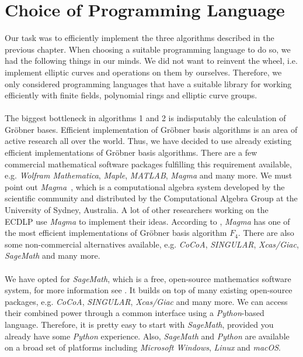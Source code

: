 \documentclass[thesis=M,english]{FITthesis}[2012/10/20]
\theoremstyle{remark}
\theoremstyle{definition}
\begin{document}
\section{Choice of Programming Language}
Our task was to efficiently implement the three algorithms described in the previous chapter. When choosing a suitable programming language to do so, we had the following things in our minds. We did not want to reinvent the wheel, i.e. implement elliptic curves and operations on them by ourselves. Therefore, we only considered programming languages that have a suitable library for working efficiently with finite fields, polynomial rings and elliptic curve groups. \\
\\ 
\noindent The biggest bottleneck in algorithms 1 and 2 is indisputably the calculation of Gröbner bases. Efficient implementation of Gröbner basis algorithms is an area of active research all over the world. Thus, we have decided to use already existing efficient implementations of Gröbner basis algorithms. There are a few commercial mathematical software packages fulfilling this requirement available, e.g. \textit{Wolfram Mathematica}, \textit{Maple}, \textit{MATLAB}, \textit{Magma} and many more. We must point out \textit{Magma}~\cite{magma}, which is a computational algebra system developed by the scientific community and distributed by the Computational Algebra Group at the University of Sydney, Australia. A lot of other researchers working on the ECDLP use \textit{Magma} to implement their ideas. According to \cite{gbComp}, \textit{Magma} has one of the most efficient implementations of Gröbner basis algorithm $F_4$. There are also some non-commercial alternatives available, e.g. \textit{CoCoA}, \textit{SINGULAR}, \textit{Xcas/Giac}, \textit{SageMath} and many more. \\ \\
\noindent We have opted for \textit{SageMath}, which is a free, open-source mathematics software system, for more information see \cite{sage}. It builds on top of many existing open-source packages, e.g. \textit{CoCoA}, \textit{SINGULAR}, \textit{Xcas/Giac} and many more. We can access their combined power through a common interface using a \textit{Python}-based language. Therefore, it is pretty easy to start with \textit{SageMath}, provided you already have some \textit{Python} experience. Also, \textit{SageMath} and \textit{Python} are available on a broad set of platforms including \textit{Microsoft Windows}, \textit{Linux} and \textit{macOS}. 
\end{document}
